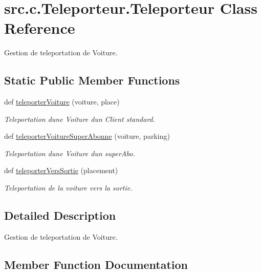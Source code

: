 \hypertarget{classsrc_1_1c_1_1_teleporteur_1_1_teleporteur}{}\section{src.\+c.\+Teleporteur.\+Teleporteur Class Reference}
\label{classsrc_1_1c_1_1_teleporteur_1_1_teleporteur}


Gestion de teleportation de Voiture.  


\subsection*{Static Public Member Functions}
\begin{DoxyCompactItemize}
\item 
def \hyperlink{classsrc_1_1c_1_1_teleporteur_1_1_teleporteur_af2f4e3ffa2bcb230819a7fb84e9e0c12}{teleporter\+Voiture} (voiture, place)
\begin{DoxyCompactList}\small\item\em Teleportation d\textquotesingle{}une Voiture d\textquotesingle{}un Client standard. \end{DoxyCompactList}\item 
def \hyperlink{classsrc_1_1c_1_1_teleporteur_1_1_teleporteur_a8005509aca8d98bdf24baf786ded2b50}{teleporter\+Voiture\+Super\+Abonne} (voiture, parking)
\begin{DoxyCompactList}\small\item\em Teleportation d\textquotesingle{}une Voiture d\textquotesingle{}un super\+Abo. \end{DoxyCompactList}\item 
def \hyperlink{classsrc_1_1c_1_1_teleporteur_1_1_teleporteur_a4713bb94f2048ebd1b742b4aabb24e1d}{teleporter\+Vers\+Sortie} (placement)
\begin{DoxyCompactList}\small\item\em Teleportation de la voiture vers la sortie. \end{DoxyCompactList}\end{DoxyCompactItemize}


\subsection{Detailed Description}
Gestion de teleportation de Voiture. 

\subsection{Member Function Documentation}
\hypertarget{classsrc_1_1c_1_1_teleporteur_1_1_teleporteur_a4713bb94f2048ebd1b742b4aabb24e1d}{}
